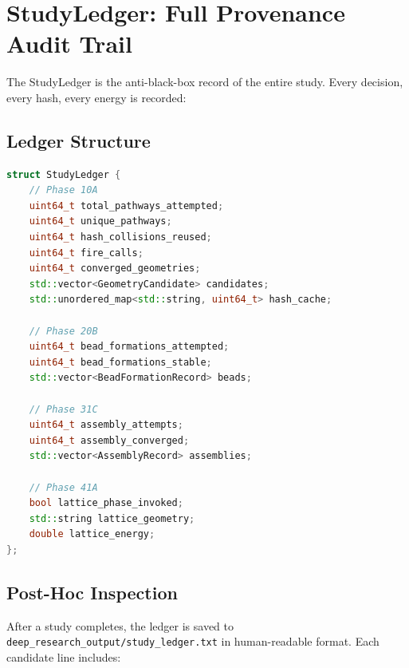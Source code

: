 \documentclass[11pt,a4paper]{article}
\begin{document}
\section{StudyLedger: Full Provenance Audit Trail}
\label{sec:ledger}

The StudyLedger is the anti-black-box record of the entire study.
Every decision, every hash, every energy is recorded:

\subsection{Ledger Structure}

\begin{lstlisting}[language=C++,title={\textbf{StudyLedger (C++ header)}}]
struct StudyLedger {
    // Phase 10A
    uint64_t total_pathways_attempted;
    uint64_t unique_pathways;
    uint64_t hash_collisions_reused;
    uint64_t fire_calls;
    uint64_t converged_geometries;
    std::vector<GeometryCandidate> candidates;
    std::unordered_map<std::string, uint64_t> hash_cache;

    // Phase 20B
    uint64_t bead_formations_attempted;
    uint64_t bead_formations_stable;
    std::vector<BeadFormationRecord> beads;

    // Phase 31C
    uint64_t assembly_attempts;
    uint64_t assembly_converged;
    std::vector<AssemblyRecord> assemblies;

    // Phase 41A
    bool lattice_phase_invoked;
    std::string lattice_geometry;
    double lattice_energy;
};
\end{lstlisting}

\subsection{Post-Hoc Inspection}

After a study completes, the ledger is saved to
\texttt{deep\_research\_output/study\_ledger.txt} in human-readable
format.  Each candidate line includes:
\end{document}
